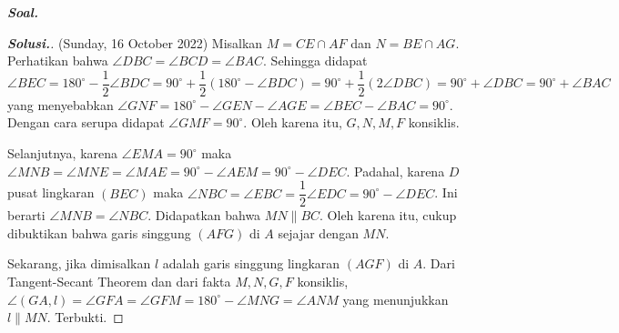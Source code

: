 \textbf{\textit{Soal. }}

\begin{proof}[\textbf{Solusi.}] (Sunday, 16 October 2022) Misalkan $M = CE \cap AF$ dan $N = BE \cap AG$.\\
Perhatikan bahwa $\angle DBC = \angle BCD = \angle BAC$. Sehingga didapat $\angle BEC = 180^\circ-\dfrac{1}{2}\angle BDC = 90^\circ+\dfrac{1}{2}(180^\circ-\angle BDC) = 90^\circ+\dfrac{1}{2}(2\angle DBC) = 90^\circ+\angle DBC = 90^\circ+\angle BAC$ yang menyebabkan $\angle GNF = 180^\circ -\angle GEN -\angle AGE = \angle BEC - \angle BAC = 90^\circ$. Dengan cara serupa didapat $\angle GMF = 90^\circ$. Oleh karena itu, $G,N,M,F$ konsiklis. 

Selanjutnya, karena $\angle EMA = 90^\circ$ maka $\angle MNB = \angle MNE = \angle MAE = 90^\circ - \angle AEM = 90^\circ -\angle DEC$. Padahal, karena $D$ pusat lingkaran $(BEC)$ maka $\angle NBC = \angle EBC = \dfrac{1}{2}\angle EDC = 90^\circ - \angle DEC$. Ini berarti $\angle MNB = \angle NBC$. Didapatkan bahwa $MN \parallel BC$. Oleh karena itu, cukup dibuktikan bahwa garis singgung $(AFG)$ di $A$ sejajar dengan $MN$.

% 


Sekarang, jika dimisalkan $l$ adalah garis singgung lingkaran $(AGF)$ di $A$. Dari Tangent-Secant Theorem dan dari fakta $M,N,G,F$ konsiklis, $\angle (GA, l)=\angle GFA = \angle GFM = 180^\circ - \angle MNG = \angle ANM$ yang menunjukkan $l \parallel MN$. Terbukti.

    
\end{proof}